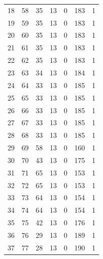 \documentclass[a4paper,twoside,12pt]{book}
\begin{document}
\begin{appendices}
\begin{table}
\begin{tabular}{lrrrrrr}
		18  &     58 &        35 &        13 &               0 &             183 &         1 \\
		19  &     59 &        35 &        13 &               0 &             183 &         1 \\
		20  &     60 &        35 &        13 &               0 &             183 &         1 \\
		21  &     61 &        35 &        13 &               0 &             183 &         1 \\
		22  &     62 &        35 &        13 &               0 &             183 &         1 \\
		23  &     63 &        34 &        13 &               0 &             184 &         1 \\
		24  &     64 &        33 &        13 &               0 &             185 &         1 \\
		25  &     65 &        33 &        13 &               0 &             185 &         1 \\
		26  &     66 &        33 &        13 &               0 &             185 &         1 \\
		27  &     67 &        33 &        13 &               0 &             185 &         1 \\
		28  &     68 &        33 &        13 &               0 &             185 &         1 \\
		29  &     69 &        58 &        13 &               0 &             160 &         1 \\
		30  &     70 &        43 &        13 &               0 &             175 &         1 \\
		31  &     71 &        65 &        13 &               0 &             153 &         1 \\
		32  &     72 &        65 &        13 &               0 &             153 &         1 \\
		33  &     73 &        64 &        13 &               0 &             154 &         1 \\
		34  &     74 &        64 &        13 &               0 &             154 &         1 \\
		35  &     75 &        42 &        13 &               0 &             176 &         1 \\
		36  &     76 &        29 &        13 &               0 &             189 &         1 \\
		37  &     77 &        28 &        13 &               0 &             190 &         1 \\

\end{tabular}
\end{table}
\end{appendices}
\end{document}

